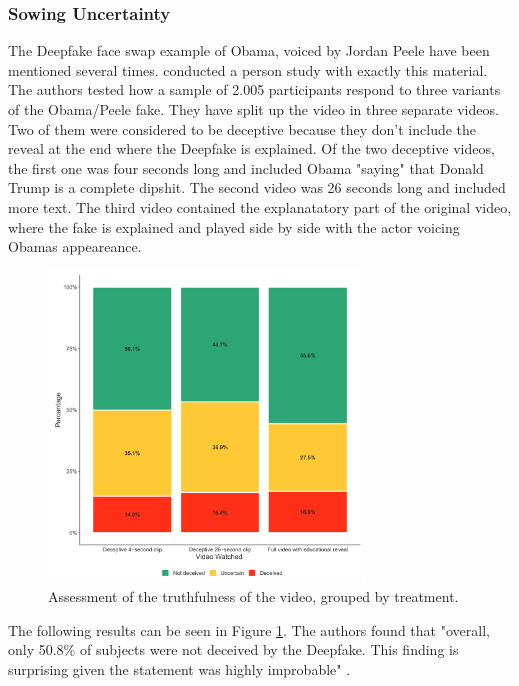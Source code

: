 \documentclass[
  a4paper,  %
  twoside,  %
  bibliography=totoc,
  headsepline,
  cleardoublepage=empty,
  parskip=half,
  draft=false
]{scrbook}
\begin{document}
\subsubsection*{Sowing Uncertainty}
The Deepfake face swap example of Obama, voiced by Jordan Peele have been mentioned several times. \citeauthor{vaccariDeepfakesDisinformationExploring2020} conducted a person study with exactly this material. The authors tested how a sample of 2.005 participants respond to three variants of the Obama/Peele fake. They have split up the video in three separate videos. Two of them were considered to be deceptive because they don't include the reveal at the end where the Deepfake is explained. Of the two deceptive videos, the first one was four seconds long and included Obama "saying" that Donald Trump is a complete dipshit. The second video was 26 seconds long and included more text. The third video contained the explanatatory part of the original video, where the fake is explained and played side by side with the actor voicing Obamas appeareance.
\begin{figure}[h]
  \centering
  \includegraphics[width=0.75\textwidth]{./graphics/images/obamafake.png}
  \caption{Assessment of the truthfulness of the video, grouped by treatment. \cite{vaccariDeepfakesDisinformationExploring2020}}
  \label{fig:obamafake-eval}
\end{figure}
The following results can be seen in Figure \ref{fig:obamafake-eval}. The authors found that "overall, only 50.8\% of subjects were not deceived by the Deepfake. This finding is surprising given the statement was highly improbable" \cite{vaccariDeepfakesDisinformationExploring2020}. 
\end{document}
